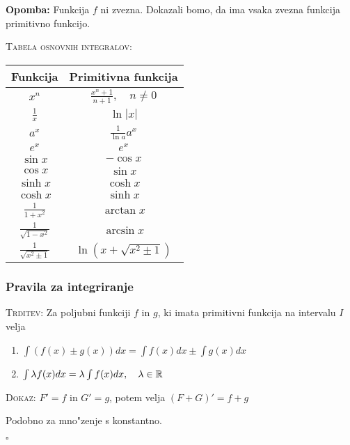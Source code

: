 \textbf{Opomba:} Funkcija $f$ ni zvezna. Dokazali bomo, da ima vsaka zvezna funkcija primitivno funkcijo.

\textsc{Tabela osnovnih integralov:}
\begin{table}[!htbp]
	\centering
	\begin{tabular}{c | c}
		\textbf{Funkcija} & \textbf{Primitivna funkcija} \\ \hline
		$x^n$ & $\frac{x^n+1}{n + 1}, \quad n \neq 0$ \\
		$\frac{1}{x}$ & $\ln |x|$ \\
		$a^x$ & $\frac{1}{\ln a} a^x$ \\
		$e^x$ & $e^x$ \\
		$\sin x$ & $- \cos x$ \\
		$\cos x$ & $\sin x$ \\
		$\sinh x$ & $\cosh x$ \\
		$\cosh x$ & $\sinh x$ \\
		$\frac{1}{1+x^2}$ & $\arctan x$ \\
		$\frac{1}{\sqrt{1 - x^2}}$ & $\arcsin x$ \\
		$\frac{1}{\sqrt{x^2 \pm 1}}$ & $\ln (x + \sqrt{x^2 \pm 1})$
	\end{tabular}
\end{table}
%
\subsubsection{Pravila za integriranje}
\textsc{Trditev:} Za poljubni funkciji $f$ in $g$, ki imata primitivni funkcija na intervalu $I$ velja
\begin{enumerate}
	\item $\int (f(x) \pm g(x)) dx = \int f(x) dx \pm \int g(x) dx$
	\item $\int \lambda f(x) dx = \lambda \int f(x) dx, \quad \lambda \in \mathbb{R}$
\end{enumerate}
\textsc{Dokaz:} $F' = f$ in $G' = g$, potem velja $(F + G)' = f + g$

Podobno za mno"zenje s konstantno.

\hfill $\square$